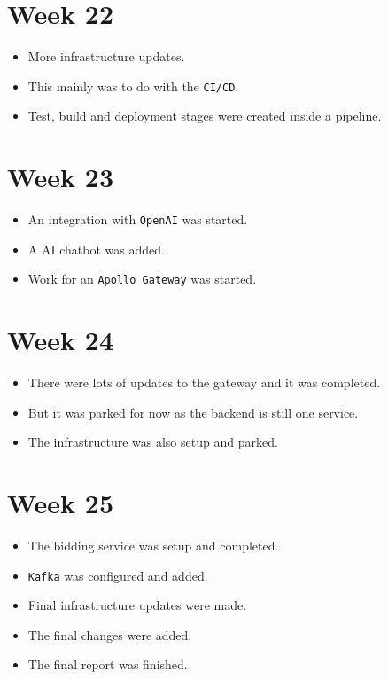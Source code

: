 \documentclass[]{project_report}
\begin{document}
\section{Week 22}
\begin{itemize}
    \item More infrastructure updates.
    \item This mainly was to do with the \texttt{CI/CD}.
    \item Test, build and deployment stages were created inside a pipeline.
\end{itemize}

\section{Week 23}
\begin{itemize}
    \item An integration with \texttt{OpenAI} was started.
    \item A AI chatbot was added.
    \item Work for an \texttt{Apollo Gateway} was started.
\end{itemize}

\section{Week 24}
\begin{itemize}
    \item There were lots of updates to the gateway and it was completed.
    \item But it was parked for now as the backend is still one service.
    \item The infrastructure was also setup and parked.
\end{itemize}

\section{Week 25}
\begin{itemize}
    \item The bidding service was setup and completed.
    \item \texttt{Kafka} was configured and added.
    \item Final infrastructure updates were made.
    \item The final changes were added.
    \item The final report was finished.
\end{itemize}
\end{document}

